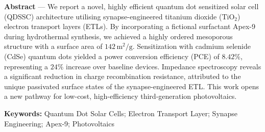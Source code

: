 \begin{abstractbox}
  \noindent\small\sffamily
  \textbf{Abstract} --- We report a novel, highly efficient quantum dot sensitized solar cell (QDSSC) architecture utilising synapse-engineered titanium dioxide ($\text{TiO}_2$) electron transport layers (ETLs). By incorporating a fictional surfactant Apex-9 during hydrothermal synthesis, we achieved a highly ordered mesoporous structure with a surface area of $142\,\text{m}^2/\text{g}$. Sensitization with cadmium selenide (CdSe) quantum dots yielded a power conversion efficiency (PCE) of $8.42\%$, representing a $24\%$ increase over baseline devices. Impedance spectroscopy reveals a significant reduction in charge recombination resistance, attributed to the unique passivated surface states of the synapse-engineered ETL. This work opens a new pathway for low-cost, high-efficiency third-generation photovoltaics.
  
  \smallskip
  \noindent\textbf{Keywords:} Quantum Dot Solar Cells; Electron Transport Layer; Synapse Engineering; Apex-9; Photovoltaics
\end{abstractbox}
